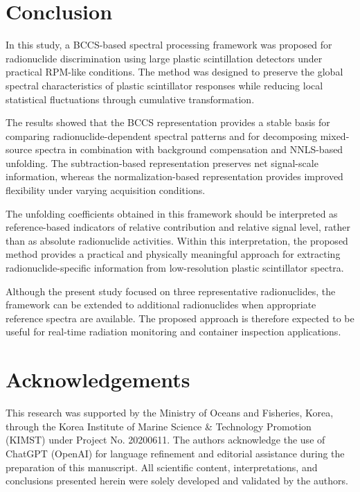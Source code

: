 \documentclass[fleqn, 10pt]{wlscirep}
\begin{document}
\section*{Conclusion}

In this study, a BCCS-based spectral processing framework was proposed for radionuclide discrimination using large plastic scintillation detectors under practical RPM-like conditions. The method was designed to preserve the global spectral characteristics of plastic scintillator responses while reducing local statistical fluctuations through cumulative transformation.

The results showed that the BCCS representation provides a stable basis for comparing radionuclide-dependent spectral patterns and for decomposing mixed-source spectra in combination with background compensation and NNLS-based unfolding. The subtraction-based representation preserves net signal-scale information, whereas the normalization-based representation provides improved flexibility under varying acquisition conditions.

The unfolding coefficients obtained in this framework should be interpreted as reference-based indicators of relative contribution and relative signal level, rather than as absolute radionuclide activities. Within this interpretation, the proposed method provides a practical and physically meaningful approach for extracting radionuclide-specific information from low-resolution plastic scintillator spectra.

Although the present study focused on three representative radionuclides, the framework can be extended to additional radionuclides when appropriate reference spectra are available. The proposed approach is therefore expected to be useful for real-time radiation monitoring and container inspection applications.


\section*{Acknowledgements}

This research was supported by the Ministry of Oceans and Fisheries, Korea, through the Korea Institute of Marine Science \& Technology Promotion (KIMST) under Project No. 20200611. The authors acknowledge the use of ChatGPT (OpenAI) for language refinement and editorial assistance during the preparation of this manuscript. All scientific content, interpretations, and conclusions presented herein were solely developed and validated by the authors.
\end{document}
